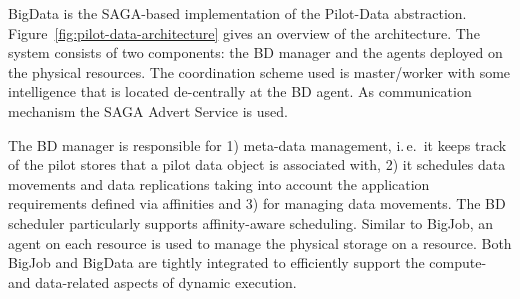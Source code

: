 \documentclass[conference,final]{IEEEtran}
\newcommand{\jhanote}[1]{ {\textcolor{red} { ***shantenu: #1 }}}
\newcommand{\jhanote}[1]{}
\newcommand{\upp}{\vspace*{-0.5em}}
\begin{document}
BigData is the SAGA-based implementation of the Pilot-Data abstraction.
Figure~\ref{fig:pilot-data-architecture} gives an overview of the architecture.
The system consists of two components: the BD manager and the agents deployed on
the physical resources. The coordination scheme used is master/worker with some
intelligence that is located de-centrally at the BD agent. As communication
mechanism the SAGA Advert Service is used.


The BD manager is responsible for 1) meta-data management, i.\,e.\ it keeps
track of the pilot stores that a pilot data object is associated with, 2) it
schedules data movements and data replications taking into account the
application requirements defined via affinities and 3) for managing data
movements. The BD scheduler particularly supports affinity-aware scheduling.
Similar to BigJob, an agent on each resource is used to manage the physical
storage on a resource. Both BigJob and BigData are tightly integrated to
efficiently support the compute- and data-related aspects of dynamic execution.


% 







\end{document}
